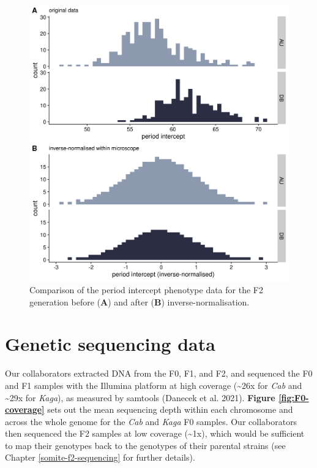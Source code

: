 \documentclass[
]{book}
\begin{document}
\begin{figure}
\includegraphics[width=1\linewidth]{figs/somites/invnorm_intercept} \caption{Comparison of the period intercept phenotype data for the F2 generation before (\textbf{A}) and after (\textbf{B}) inverse-normalisation.}\label{fig:invnorm-intercept}
\end{figure}

\hypertarget{genetic-sequencing-data}{%
\section{Genetic sequencing data}\label{genetic-sequencing-data}}

Our collaborators extracted DNA from the F0, F1, and F2, and sequenced the F0 and F1 samples with the Illumina platform at high coverage (\textasciitilde26x for \emph{Cab} and \textasciitilde29x for \emph{Kaga}), as measured by samtools (Danecek et al. 2021). \textbf{Figure \ref{fig:F0-coverage}} sets out the mean sequencing depth within each chromosome and across the whole genome for the \emph{Cab} and \emph{Kaga} F0 samples. Our collaborators then sequenced the F2 samples at low coverage (\textasciitilde1x), which would be sufficient to map their genotypes back to the genotypes of their parental strains (see Chapter \ref{somite-f2-sequencing} for further details).
\end{document}
